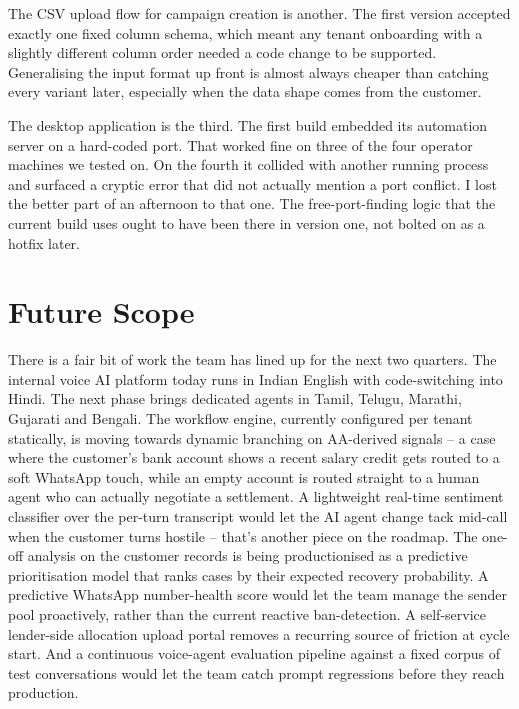 The CSV upload flow for campaign creation is another. The first version accepted exactly one fixed column schema, which meant any tenant onboarding with a slightly different column order needed a code change to be supported. Generalising the input format up front is almost always cheaper than catching every variant later, especially when the data shape comes from the customer.

The desktop application is the third. The first build embedded its automation server on a hard-coded port. That worked fine on three of the four operator machines we tested on. On the fourth it collided with another running process and surfaced a cryptic error that did not actually mention a port conflict. I lost the better part of an afternoon to that one. The free-port-finding logic that the current build uses ought to have been there in version one, not bolted on as a hotfix later.

\section{Future Scope}
There is a fair bit of work the team has lined up for the next two quarters. The internal voice AI platform today runs in Indian English with code-switching into Hindi. The next phase brings dedicated agents in Tamil, Telugu, Marathi, Gujarati and Bengali. The workflow engine, currently configured per tenant statically, is moving towards dynamic branching on AA-derived signals -- a case where the customer's bank account shows a recent salary credit gets routed to a soft WhatsApp touch, while an empty account is routed straight to a human agent who can actually negotiate a settlement. A lightweight real-time sentiment classifier over the per-turn transcript would let the AI agent change tack mid-call when the customer turns hostile -- that's another piece on the roadmap. The one-off analysis on the customer records is being productionised as a predictive prioritisation model that ranks cases by their expected recovery probability. A predictive WhatsApp number-health score would let the team manage the sender pool proactively, rather than the current reactive ban-detection. A self-service lender-side allocation upload portal removes a recurring source of friction at cycle start. And a continuous voice-agent evaluation pipeline against a fixed corpus of test conversations would let the team catch prompt regressions before they reach production.

